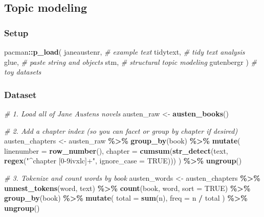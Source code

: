 \documentclass[
]{book}
\newenvironment{Shaded}{\begin{snugshade}}{\end{snugshade}}
\newcommand{\AttributeTok}[1]{\textcolor[rgb]{0.13,0.29,0.53}{#1}}
\newcommand{\CommentTok}[1]{\textcolor[rgb]{0.56,0.35,0.01}{\textit{#1}}}
\newcommand{\ConstantTok}[1]{\textcolor[rgb]{0.56,0.35,0.01}{#1}}
\newcommand{\FunctionTok}[1]{\textcolor[rgb]{0.13,0.29,0.53}{\textbf{#1}}}
\newcommand{\NormalTok}[1]{#1}
\newcommand{\OtherTok}[1]{\textcolor[rgb]{0.56,0.35,0.01}{#1}}
\newcommand{\SpecialCharTok}[1]{\textcolor[rgb]{0.81,0.36,0.00}{\textbf{#1}}}
\newcommand{\StringTok}[1]{\textcolor[rgb]{0.31,0.60,0.02}{#1}}
\begin{document}
\subsection{Topic modeling}\label{topic-modeling}

\subsubsection{Setup}\label{setup-6}

\begin{Shaded}
\begin{Highlighting}[]
\NormalTok{pacman}\SpecialCharTok{::}\FunctionTok{p\_load}\NormalTok{(}
\NormalTok{  janeaustenr, }\CommentTok{\# example text}
\NormalTok{  tidytext, }\CommentTok{\# tidy text analysis}
\NormalTok{  glue, }\CommentTok{\# paste string and objects}
\NormalTok{  stm, }\CommentTok{\# structural topic modeling}
\NormalTok{  gutenbergr}
\NormalTok{) }\CommentTok{\# toy datasets}
\end{Highlighting}
\end{Shaded}

\subsubsection{Dataset}\label{dataset-1}

\begin{Shaded}
\begin{Highlighting}[]
\CommentTok{\# 1. Load all of Jane Austen\textquotesingle{}s novels}
\NormalTok{austen\_raw }\OtherTok{\textless{}{-}} \FunctionTok{austen\_books}\NormalTok{()}

\CommentTok{\# 2. Add a chapter index (so you can facet or group by chapter if desired)}
\NormalTok{austen\_chapters }\OtherTok{\textless{}{-}}\NormalTok{ austen\_raw }\SpecialCharTok{\%\textgreater{}\%}
  \FunctionTok{group\_by}\NormalTok{(book) }\SpecialCharTok{\%\textgreater{}\%}
  \FunctionTok{mutate}\NormalTok{(}
    \AttributeTok{linenumber =} \FunctionTok{row\_number}\NormalTok{(),}
    \AttributeTok{chapter    =} \FunctionTok{cumsum}\NormalTok{(}\FunctionTok{str\_detect}\NormalTok{(text, }\FunctionTok{regex}\NormalTok{(}\StringTok{"\^{}chapter [0{-}9ivxlc]+"}\NormalTok{, }\AttributeTok{ignore\_case =} \ConstantTok{TRUE}\NormalTok{)))}
\NormalTok{  ) }\SpecialCharTok{\%\textgreater{}\%}
  \FunctionTok{ungroup}\NormalTok{()}

\CommentTok{\# 3. Tokenize and count words by book}
\NormalTok{austen\_words }\OtherTok{\textless{}{-}}\NormalTok{ austen\_chapters }\SpecialCharTok{\%\textgreater{}\%}
  \FunctionTok{unnest\_tokens}\NormalTok{(word, text) }\SpecialCharTok{\%\textgreater{}\%}
  \FunctionTok{count}\NormalTok{(book, word, }\AttributeTok{sort =} \ConstantTok{TRUE}\NormalTok{) }\SpecialCharTok{\%\textgreater{}\%}
  \FunctionTok{group\_by}\NormalTok{(book) }\SpecialCharTok{\%\textgreater{}\%}
  \FunctionTok{mutate}\NormalTok{(}
    \AttributeTok{total =} \FunctionTok{sum}\NormalTok{(n),}
    \AttributeTok{freq  =}\NormalTok{ n }\SpecialCharTok{/}\NormalTok{ total}
\NormalTok{  ) }\SpecialCharTok{\%\textgreater{}\%}
  \FunctionTok{ungroup}\NormalTok{()}
\end{Highlighting}
\end{Shaded}
\end{document}
